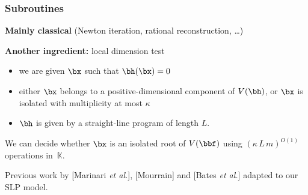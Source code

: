 \documentclass[mathserif,11pt]{beamer}
\def\db#1{\textcolor{_darkblue}{#1}}
\def\rf#1{\db{[{\sf \scriptsize #1}]}}
\def\rk#1{\cdef{{\bf \small #1}}}
\def\cdef#1{\textcolor{_cdef}{#1}}
\newcommand{\red}[1]{\textcolor{col4}{#1}}
\newcommand{\mythm}[2]{
  \begin{tcolorbox}[colframe=blue!75!black,colback=white,title={\sf\small #1}]
#2
\end{tcolorbox}
}
\def\K{\mathbb{K}}
\begin{document}
\begin{frame}

\frametitle{Subroutines}

\rk{Mainly classical} (Newton iteration, rational reconstruction, \dots)

\medskip

\rk{Another ingredient:} local dimension test
\begin{itemize}
\item we are given $\bx$ such that $\bh(\bx)=0$
\item either $\bx$ belongs to a positive-dimensional component of  $V(\bh)$,
 or $\bx$ is isolated with multiplicity at most $\kappa$
\item $\bh$ is given by a straight-line program of length $L$.
\end{itemize}

\mythm{Proposition}{
We can decide whether $\bx$ is an isolated root of $V(\bbf)$ using
\red{$(\kappa\,L\,m)^{O(1)}$} operations in~$\K$.
}

Previous work by \rf{Marinari {\it et al.}}, \rf{Mourrain} and
\rf{Bates {\it et al.}} adapted to our SLP model.

\end{frame}

\end{document}

